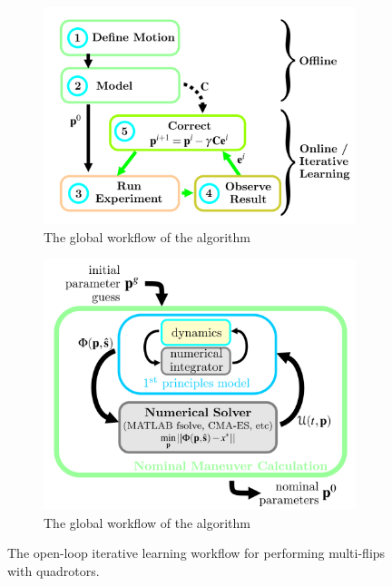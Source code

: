 \documentclass{thesisreport}
\begin{document}
\begin{figure}[h]
     \centering
     \begin{subfigure}[b]{0.45\textwidth}
         \centering
         \includegraphics[width=\textwidth]{Images/Flip/Open_Loop_iterative_learning_a}
         \caption{The global workflow of the algorithm}
         \label{fig:Open_Loop_a}
     \end{subfigure}
     \hfill
     \begin{subfigure}[b]{0.45\textwidth}
         \centering
         \includegraphics[width=\textwidth]{Images/Flip/Open_Loop_iterative_learning_b}
         \caption{The global workflow of the algorithm}
         \label{fig:Open_Loop_b}
     \end{subfigure}
        \caption{The open-loop iterative learning workflow for performing multi-flips with quadrotors\cite{Lupashin2012}.}
        \label{Open_Loop_iterative_Learning}
\end{figure}
\end{document}
